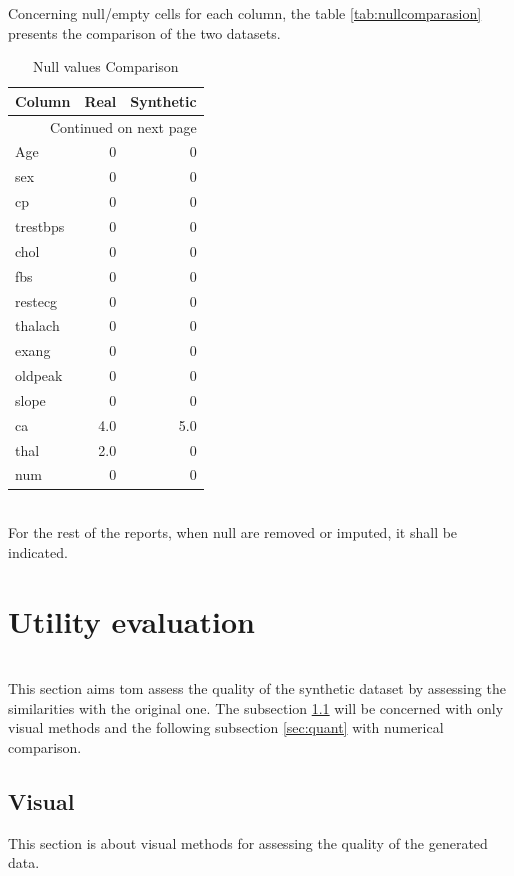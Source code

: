 \documentclass{article}
\begin{document}
Concerning null/empty cells for each column, the table \ref{tab:nullcomparasion} presents the comparison of the two datasets.\\

\begin{longtable}{lrr}
\caption{Null values Comparison}\label{tab:nullcomparison}\\
\toprule
   Column & Real & Synthetic \\
\midrule
\endhead
\midrule
\multicolumn{3}{r}{{Continued on next page}} \\
\midrule
\endfoot

\bottomrule
\endlastfoot
      Age &    0 &         0 \\
      sex &    0 &         0 \\
       cp &    0 &         0 \\
 trestbps &    0 &         0 \\
     chol &    0 &         0 \\
      fbs &    0 &         0 \\
  restecg &    0 &         0 \\
  thalach &    0 &         0 \\
    exang &    0 &         0 \\
  oldpeak &    0 &         0 \\
    slope &    0 &         0 \\
       ca &  4.0 &       5.0 \\
     thal &  2.0 &         0 \\
      num &    0 &         0 \\
\end{longtable}
\\

For the rest of the reports, when null are removed or imputed, it shall be indicated.
\section{Utility evaluation}\\
This section aims tom assess the quality of the synthetic dataset by assessing the similarities with the original one. The subsection \ref{sec:visual} will be concerned with only visual methods and the following subsection \ref{sec:quant} with numerical comparison.\\
\subsection{Visual}  \label{sec:visual}
This section is about visual methods for assessing the quality of the generated data.\\
\end{document}
